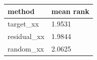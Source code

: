 \begin{tabular}{ll}
\toprule
method & mean rank \\
\midrule
target\_xx & 1.9531 \\
residual\_xx & 1.9844 \\
random\_xx & 2.0625 \\
\bottomrule
\end{tabular}
